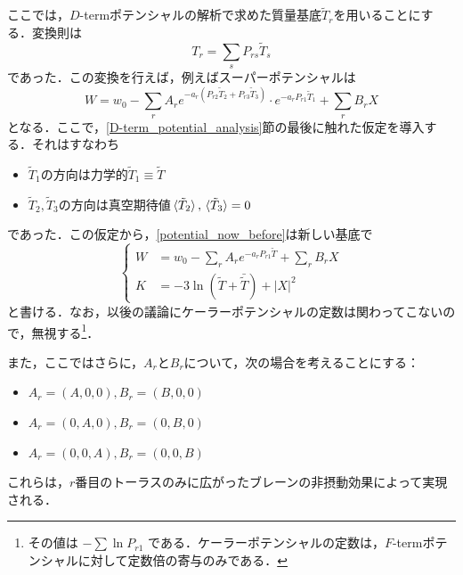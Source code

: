 \documentclass[a4paper,uplatex,dvipdfmx,10pt]{jsarticle}
\theoremstyle{definition}
\begin{document}
ここでは，$D$-termポテンシャルの解析で求めた質量基底$\tilde{T}_{r}$を用いることにする．変換則は
\begin{equation}
   T_{r}
   =
   \sum_{s}P_{rs}\tilde{T}_{s}
   \nonumber
\end{equation}
であった．この変換を行えば，例えばスーパーポテンシャルは
\begin{equation}
   W
   =
   w_{0}
   -
   \sum_{r}
   A_{r}e^{-a_{r}(P_{r2}\tilde{T}_{2}+P_{r3}\tilde{T}_{3})}
   \cdot
   e^{-a_{r}P_{r1}\tilde{T}_{1}}
   +
   \sum_{r}
   B_{r}
   X
   \nonumber
\end{equation}
となる．ここで，\ref{D-term_potential_analysis}節の最後に触れた仮定を導入する．それはすなわち
\begin{itemize}
   \item 
   $\tilde{T}_1$の方向は力学的$\tilde{T}_{1}\equiv\tilde{T}$
   \item 
   $\tilde{T}_{2},\tilde{T}_{3}$の方向は真空期待値$\ev*{\tilde{T}_{2}},\ev*{\tilde{T}_{3}}=0$
\end{itemize}   
であった．この仮定から，\eqref{potential_now_before}は新しい基底で
\begin{equation}
   \left\{
      \begin{alignedat}{1}
         W
         &=w_{0}
         -
         \sum_{r}
         A_{r}
         e^{-a_{r}P_{r1}\tilde{T}}
         +
         \sum_{r}
         B_{r}
         X
         \\
         K
         &=
         -
         3\ln(\tilde{T}+\bar{\tilde{T}})
         +
         |X|^2
      \end{alignedat}
   \right.
   \label{potential_now_after}
\end{equation}
と書ける．なお，以後の議論にケーラーポテンシャルの定数は関わってこないので，無視する\footnote{
   その値は
   $
      -\sum\ln P_{r1}
   $
   である．ケーラーポテンシャルの定数は，$F$-termポテンシャルに対して定数倍の寄与のみである．
}．

また，ここではさらに，$A_{r}$と$B_{r}$について，次の場合を考えることにする：
\begin{itemize}
   \item 
   $A_{r}=(A,0,0),B_{r}=(B,0,0)$
   \item 
   $A_{r}=(0,A,0),B_{r}=(0,B,0)$
   \item 
   $A_{r}=(0,0,A),B_{r}=(0,0,B)$
\end{itemize}
これらは，$r$番目のトーラスのみに広がったブレーンの非摂動効果によって実現される\cite{Dine_SupersymmetryString_2023}．
\end{document}
